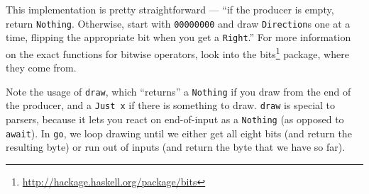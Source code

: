 \documentclass[]{article}
\newenvironment{Shaded}{}{}
\newcommand{\CommentTok}[1]{\textcolor[rgb]{0.38,0.63,0.69}{\textit{#1}}}
\newcommand{\DataTypeTok}[1]{\textcolor[rgb]{0.56,0.13,0.00}{#1}}
\newcommand{\DecValTok}[1]{\textcolor[rgb]{0.25,0.63,0.44}{#1}}
\newcommand{\FunctionTok}[1]{\textcolor[rgb]{0.02,0.16,0.49}{#1}}
\newcommand{\KeywordTok}[1]{\textcolor[rgb]{0.00,0.44,0.13}{\textbf{#1}}}
\newcommand{\NormalTok}[1]{#1}
\newcommand{\OperatorTok}[1]{\textcolor[rgb]{0.40,0.40,0.40}{#1}}
\newcommand{\OtherTok}[1]{\textcolor[rgb]{0.00,0.44,0.13}{#1}}
\renewcommand{\href}[2]{#2\footnote{\url{#1}}}
\begin{document}
\begin{Shaded}
\end{Shaded}

This implementation is pretty straightforward --- ``if the producer is empty,
return \texttt{Nothing}. Otherwise, start with \texttt{00000000} and draw
\texttt{Direction}s one at a time, flipping the appropriate bit when you get a
\texttt{Right}.'' For more information on the exact functions for bitwise
operators, look into the \href{http://hackage.haskell.org/package/bits}{bits}
package, where they come from.

Note the usage of \texttt{draw}, which ``returns'' a \texttt{Nothing} if you
draw from the end of the producer, and a \texttt{Just\ x} if there is something
to draw. \texttt{draw} is special to parsers, because it lets you react on
end-of-input as a \texttt{Nothing} (as opposed to \texttt{await}). In
\texttt{go}, we loop drawing until we either get all eight bits (and return the
resulting byte) or run out of inputs (and return the byte that we have so far).
\end{document}
